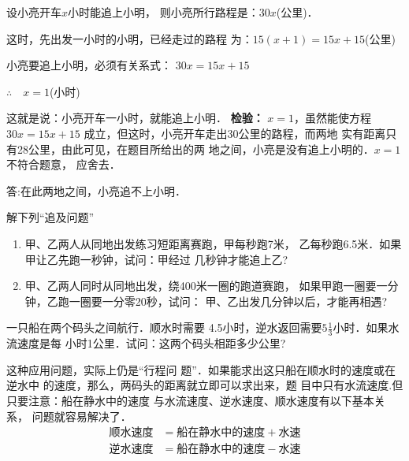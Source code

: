 \begin{solution}    
设小亮开车$x$小时能追上小明，
        则小亮所行路程是：$30x$(公里)．

    这时，先出发一小时的小明，已经走过的路程
为：$15(x+1)=15x + 15$(公里)

    小亮要追上小明，必须有关系式：
            $  30x=15x+15$
\begin{center}
    $\therefore\quad x= 1$(小时)
\end{center}
 这就是说：小亮开车一小时，就能追上小明．
\textbf{检验：} $x=1$，虽然能使方程$30x =15x + 15$
成立，但这时，小亮开车走出30公里的路程，而两地
实有距离只有28公里，由此可见，在题目所给出的两
地之间，小亮是没有追上小明的．$x=1$不符合题意，
应舍去．

    答:在此两地之间，小亮追不上小明．
\end{solution}


\begin{ex}
    解下列“追及问题”
\begin{enumerate}
    \item 甲、乙两人从同地出发练习短距离赛跑，甲每秒跑7米，
    乙每秒跑6.5米．如果甲让乙先跑一秒钟，试问：甲经过
    几秒钟才能追上乙?
    \item    甲、乙两人同时从同地出发，绕400米一圈的跑道赛跑，
    如果甲跑一圈要一分钟，乙跑一圈要一分零20秒，试问：
    甲、乙出发几分钟以后，才能再相遇?
\end{enumerate}  
\end{ex}



\begin{example}
一只船在两个码头之间航行．顺水时需要
4.5小时，逆水返回需要$5\frac{1}{3}$小时．如果水流速度是每
小时1公里．试问：这两个码头相距多少公里?
\end{example}

\begin{analyze}
    这种应用问题，实际上仍是“行程问
题”．如果能求出这只船在顺水时的速度或在逆水中
的速度，那么，两码头的距离就立即可以求出来，题
目中只有水流速度.但只要注意：船在静水中的速度
与水流速度、逆水速度、顺水速度有以下基本关系，
问题就容易解决了．
\[\begin{split}
    \text{顺水速度}&=\text{船在静水中的速度}+\text{水速}\\
    \text{逆水速度}&=\text{船在静水中的速度}-\text{水速}\\
\end{split}\]    
\end{analyze}

